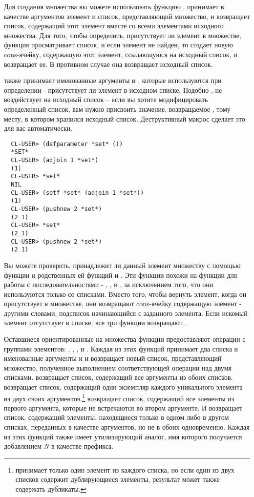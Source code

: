 Для создания множества вы можете использовать функцию . 
принимает в качестве аргументов элемент и список, представляющий множество, и возвращает
список, содержащий этот элемент вместе со всеми элементами исходного множества.  Для того,
чтобы определить, присутствует ли элемент в множестве, функция просматривает список, и
если элемент не найден, то  создает новую cons-ячейку, содержащую этот
элемент, ссылающуюся на исходный список, и возвращает ее. В противном случае она
возвращает исходный список.

 также принимает именованные аргументы  и , которые
используются при определении - присутствует ли элемент в исходном списке. Подобно
,  не воздействует на исходный список -- если вы хотите
модифицировать определенный список, вам нужно присвоить значение, возвращаемое
, тому месту, в котором хранился исходный список. Деструктивный макрос
 сделает это для вас автоматически.

\begin{verbatim}
  CL-USER> (defparameter *set* ())
  *SET*
  CL-USER> (adjoin 1 *set*)
  (1)
  CL-USER> *set*
  NIL
  CL-USER> (setf *set* (adjoin 1 *set*))
  (1)
  CL-USER> (pushnew 2 *set*)
  (2 1)
  CL-USER> *set*
  (2 1)
  CL-USER> (pushnew 2 *set*)
  (2 1)
\end{verbatim}

Вы можете проверить, принадлежит ли данный элемент множеству с помощью функции
 и родственных ей функций  и . Эти
функции похожи на функции для работы с последовательностями - , ,
и , за исключением того, что они используются только со списками. Вместо
того, чтобы вернуть элемент, когда он присутствует в множестве, они возвращают cons-ячейку
содержащую элемент - другими словами, подсписок начинающийся с заданного элемента. Если
искомый элемент отсутствует в списке, все три функции возвращают .

Оставшиеся ориентированные на множества функции предоставляют операции с группами
элементов: , , , и
.  Каждая из этих функций принимает два списка и именованные
аргументы  и  и возвращает новый список, представляющий множество,
полученное выполнением соответствующей операции над двумя списками. 
возвращает список, содержащий все аргументы из обоих списков.  возвращает
список, содержащий один экземпляр каждого уникального элемента из двух своих
аргументов.\footnote{ принимает только один элемент из каждого списка, но если
  один из двух списков содержит дублирующиеся элементы, результат может также содержать
  дубликаты.}  возвращает список, содержащий все элементы из первого
аргумента, которые не встречаются во втором аргументе. И 
возвращает список, содержащий элементы, находящиеся только в одном либо в другом списках,
переданных в качестве аргументов, но не в обоих одновременно. Каждая из этих функций также
имеет утилизирующий аналог, имя которого получается добавлением \textit{N} в качестве
префикса.

